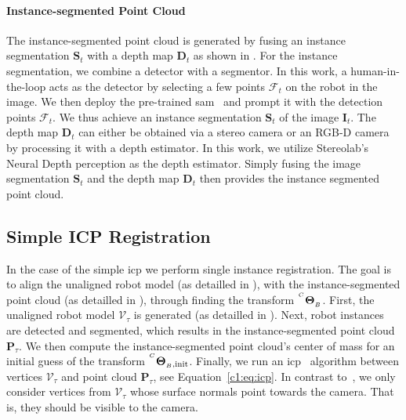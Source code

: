 \paragraph{Instance-segmented Point Cloud}
\label{c1:sec:instance_segmented_point_cloud}
The instance-segmented point cloud is generated by fusing an instance segmentation $\mathbf{S}_t$ with a depth map $\mathbf{D}_t$ as shown in . For the instance segmentation, we combine a detector with a segmentor. In this work, a human-in-the-loop acts as the detector by selecting a few points $\mathcal{F}_t$ on the robot in the image. We then deploy the pre-trained \gls{sam}~\cite{Kirillov:iccv:2023} and prompt it with the detection points $\mathcal{F}_t$. We thus achieve an instance segmentation $\mathbf{S}_t$ of the image $\mathbf{I}_t$. The depth map $\mathbf{D}_t$ can either be obtained via a stereo camera or an RGB-D camera by processing it with a depth estimator. In this work, we utilize Stereolab's Neural Depth perception as the depth estimator. Simply fusing the image segmentation $\mathbf{S}_t$ and the depth map $\mathbf{D}_t$ then provides the instance segmented point cloud.



\subsection{Simple ICP Registration}
\label{c1:sec:simple_icp_registration}
In the case of the simple \gls{icp} we perform single instance registration. The goal is to align the unaligned robot model (as detailled in ), with the instance-segmented point cloud (as detailled in ), through finding the transform ${}^{^C}\mathbf{\Theta}_{_B}$. First, the unaligned robot model $\mathcal{V}_\tau$ is generated (as detailled in ). Next, robot instances are detected and segmented, which results in the instance-segmented point cloud $\mathbf{P}_\tau$. We then compute the instance-segmented point cloud's center of mass for an initial guess of the transform ${}^{^{C}}\mathbf{\Theta}_{_B,\text{init}}$. Finally, we run an \gls{icp}~\cite{simple_icp} algorithm between vertices $\mathcal{V}_\tau$ and point cloud $\mathbf{P}_\tau$, see Equation~\ref{c1:eq:icp}. In contrast to~\cite{simple_icp}, we only consider vertices from $\mathcal{V}_\tau$ whose surface normals point towards the camera. That is, they should be visible to the camera.

